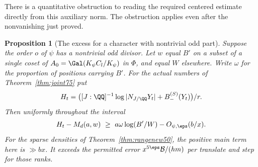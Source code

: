 \documentclass[a4paper,11pt]{article}
\newtheorem{proposition}{Proposition}[section]
\theoremstyle{definition}
\theoremstyle{remark}
\numberwithin{equation}{section}
\begin{document}
There is a quantitative obstruction to reading the required
centered estimate directly from this auxiliary norm. The
obstruction applies even after the nonvanishing just proved.

\begin{proposition}[The excess for a character with nontrivial odd part]\label{prop:excess75}
Suppose the order \(o\) of \(\psi\) has a nontrivial odd divisor.
Let \(w\) equal \(B'\) on a subset of a single coset of
\(A_0=\Gal(K_\psi C_l/K_\psi)\) in \(\Phi\), and equal
\(W\) elsewhere. Write \(\omega\) for the proportion of
positions carrying \(B'\). For the actual numbers of
Theorem~\ref{thm:joint75} put
\[
 H_t=\bigl([J:\QQ]^{-1}\log|N_{J/\QQ}Y_t|
                           +B_-^{(S)}(Y_t)\bigr)/r .
\]
Then uniformly throughout the interval
\begin{equation}
       H_t-M_d(a,w)\ \ge\ a\omega\log(B'/W)
                                      -O_{\psi,\eps}(b/x).
                                                        \label{eq:excess75}
\end{equation}
For the sparse densities of Theorem~\ref{thm:rangenew50},
the positive main term here is \(\gg bx\).
It exceeds the permitted error \(x^{5\eps}\mathcal B/(hm)\)
per translate and step for those ranks.
\end{proposition}
\end{document}
